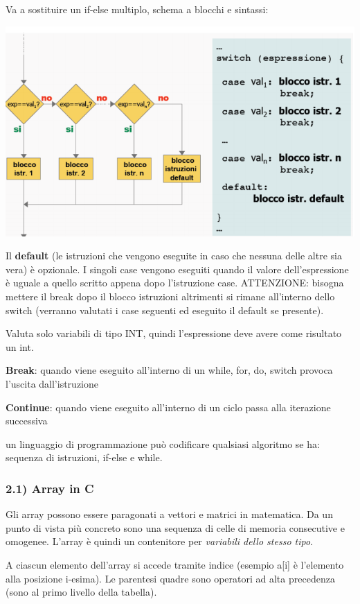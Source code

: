 \documentclass[
  paper=a4,
  oneside  ,captions=tableheading
]{scrbook}
\begin{document}
Va a sostituire un if-else multiplo, schema a blocchi e sintassi:
\begin{center}
\includegraphics{./image/image-20201207224317378.png}
\end{center}
Il \textbf{default} (le istruzioni che vengono eseguite in caso che
nessuna delle altre sia vera) è opzionale. I singoli case vengono
eseguiti quando il valore dell'espressione è uguale a quello scritto
appena dopo l'istruzione case. ATTENZIONE: bisogna mettere il break dopo
il blocco istruzioni altrimenti si rimane all'interno dello switch
(verranno valutati i case seguenti ed eseguito il default se presente).

Valuta solo variabili di tipo INT, quindi l'espressione deve avere come
risultato un int.

\textbf{Break}: quando viene eseguito all'interno di un while, for, do,
switch provoca l'uscita dall'istruzione

\textbf{Continue}: quando viene eseguito all'interno di un ciclo passa
alla iterazione successiva

un linguaggio di programmazione può codificare qualsiasi algoritmo se
ha: sequenza di istruzioni, if-else e while.

\hypertarget{array-in-c}{%
\subsubsection{2.1) Array in C}\label{array-in-c}}

Gli array possono essere paragonati a vettori e matrici in matematica.
Da un punto di vista più concreto sono una sequenza di celle di memoria
consecutive e omogenee. L'array è quindi un contenitore per
\emph{variabili dello stesso tipo}.

A ciascun elemento dell'array si accede tramite indice (esempio a{[}i{]}
è l'elemento alla posizione i-esima). Le parentesi quadre sono operatori
ad alta precedenza (sono al primo livello della tabella).
\end{document}
